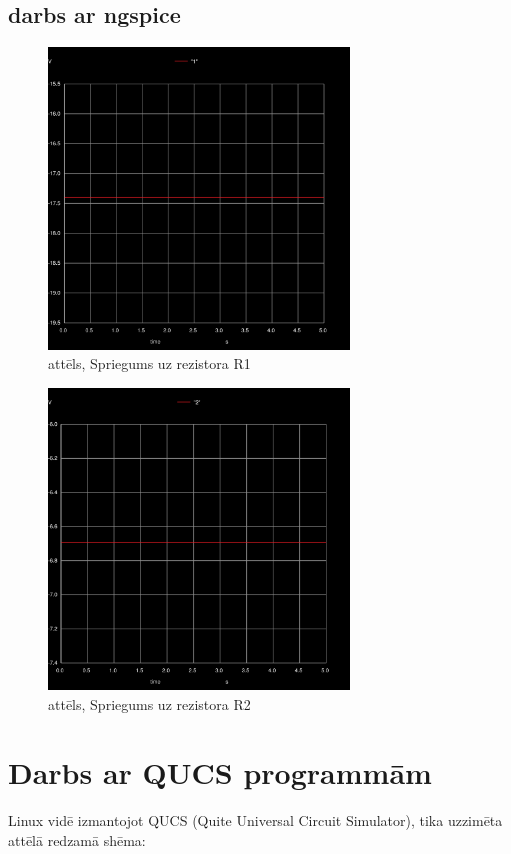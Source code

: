\documentclass[a4paper,10pt]{report}
\begin{document}
\subsection{darbs ar ngspice}
\begin{figure}[H]
\includegraphics[width=8cm,height=8cm,keepaspectratio]{011.jpg}
\caption{attēls, Spriegums uz rezistora R1}
\end{figure}
\begin{figure}[H]
\includegraphics[width=8cm,height=8cm,keepaspectratio]{022.jpg}
\caption{attēls, Spriegums uz rezistora R2}
\end{figure}
\section{Darbs ar QUCS programmām}
Linux vidē izmantojot QUCS (Quite Universal Circuit Simulator),
tika uzzimēta attēlā redzamā shēma:
\end{document}
